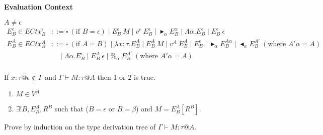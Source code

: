 \documentclass[9pt, a4paper]{extarticle}
\theoremstyle{break}
\newcommand{\figheader}[2]{
  \begin{flushleft}
    #2 {\bf \normalsize #1}
\end{flushleft}}
\newcommand{\G}{\Gamma}
\newcommand{\V}{\vdash}
\newcommand{\TB}{\blacktriangleright}
\newcommand{\TBL}{\blacktriangleleft}
\begin{document}
\figheader{Evaluation Context}{}
$A \neq \epsilon$\\
\begin{align*}
    E^\epsilon_B \in ECtx^\epsilon_B & ::= \square\ (\text{if\ } B = \epsilon) \mid E^\epsilon_B\ M \mid v^e\ E^\epsilon_B
                                           \mid \TB_\alpha E^\alpha_B \mid \Lambda\alpha.E^\epsilon_B
                                           \mid E^\epsilon_B\ \epsilon  \\
    E^A_B \in ECtx^A_B & ::= \square\ (\text{if } A = B) \mid \lambda x:\tau.E^A_B \mid E^A_B\ M \mid v^A\ E^A_B
                                           \mid E^\epsilon_B \mid \TB_\alpha E^{A\alpha}_B
                                           \mid \TBL_\alpha E^{A'}_B \ (\text{where } A'\alpha = A) \\
                                           & \quad \mid \Lambda\alpha.E^\epsilon_B
                                           \mid E^A_B\ \epsilon \mid \%_\alpha\ E^{A'}_B \ (\text{where } A'\alpha = A)\\
\end{align*}

\begin{thm}
    If $x:\tau@\epsilon \notin \G$ and $\G \V M : \tau @ A$ then 1 or 2 is true.
    \begin{enumerate}
        \item $ M \in V^A$
        \item $\exists ! B, E^A_B, R^B$ such that ($B = \epsilon$ or $B = \beta$) and $M = E^A_B[R^B]$.
    \end{enumerate}
\end{thm}

Prove by induction on the type derivation tree of $\G \V M:\tau@A$.
\end{document}
